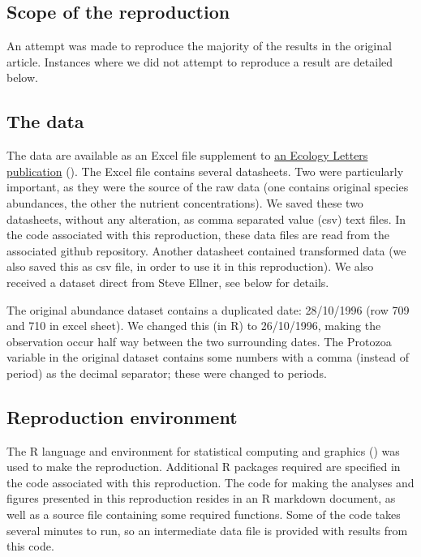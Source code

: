 \documentclass[10pt,a4paper,onecolumn]{article}
\begin{document}
\subsection{Scope of the reproduction}\label{scope-of-the-reproduction}

An attempt was made to reproduce the majority of the results in the
original article. Instances where we did not attempt to reproduce a
result are detailed below.

\subsection{The data}\label{the-data}

The data are available as an Excel file supplement to
\href{http://onlinelibrary.wiley.com/doi/10.1111/j.1461-0248.2009.01391.x/abstract}{an
Ecology Letters publication} (\textcite{Beninca2009}). The Excel file
contains several datasheets. Two were particularly important, as they
were the source of the raw data (one contains original species
abundances, the other the nutrient concentrations). We saved these two
datasheets, without any alteration, as comma separated value (csv) text
files. In the code associated with this reproduction, these data files
are read from the associated github repository. Another datasheet
contained transformed data (we also saved this as csv file, in order to
use it in this reproduction). We also received a dataset direct from
Steve Ellner, see below for details.

The original abundance dataset contains a duplicated date: 28/10/1996
(row 709 and 710 in excel sheet). We changed this (in R) to 26/10/1996,
making the observation occur half way between the two surrounding dates.
The Protozoa variable in the original dataset contains some numbers with
a comma (instead of period) as the decimal separator; these were changed
to periods.

\subsection{Reproduction environment}\label{reproduction-environment}

The R language and environment for statistical computing and graphics
(\textcite{R}) was used to make the reproduction. Additional R packages
required are specified in the code associated with this reproduction.
The code for making the analyses and figures presented in this
reproduction resides in an R markdown document, as well as a source file
containing some required functions. Some of the code takes several
minutes to run, so an intermediate data file is provided with results
from this code.
\end{document}
